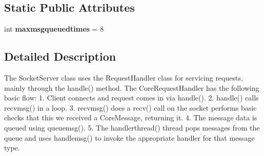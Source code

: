 \subsection*{Static Public Attributes}
\begin{DoxyCompactItemize}
\item 
\hypertarget{classcore_1_1coreserver_1_1_core_request_handler_a0802026cf46b6b5723f066d2a6be7966}{int {\bfseries maxmsgqueuedtimes} = 8}\label{classcore_1_1coreserver_1_1_core_request_handler_a0802026cf46b6b5723f066d2a6be7966}

\end{DoxyCompactItemize}


\subsection{Detailed Description}
\begin{DoxyVerb}The SocketServer class uses the RequestHandler class for servicing
requests, mainly through the handle() method. The CoreRequestHandler
has the following basic flow:
   1. Client connects and request comes in via handle().
   2. handle() calls recvmsg() in a loop.
   3. recvmsg() does a recv() call on the socket performs basic
      checks that this we received a CoreMessage, returning it.
   4. The message data is queued using queuemsg().
   5. The handlerthread() thread pops messages from the queue and uses
      handlemsg() to invoke the appropriate handler for that message type.\end{DoxyVerb}
 

